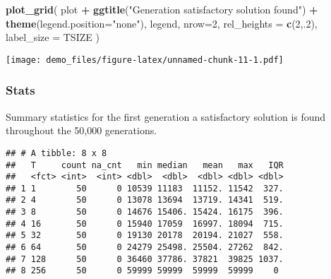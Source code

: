 \documentclass[]{book}
\newenvironment{Shaded}{\begin{snugshade}}{\end{snugshade}}
\newcommand{\DataTypeTok}[1]{\textcolor[rgb]{0.13,0.29,0.53}{#1}}
\newcommand{\DecValTok}[1]{\textcolor[rgb]{0.00,0.00,0.81}{#1}}
\newcommand{\KeywordTok}[1]{\textcolor[rgb]{0.13,0.29,0.53}{\textbf{#1}}}
\newcommand{\NormalTok}[1]{#1}
\newcommand{\OperatorTok}[1]{\textcolor[rgb]{0.81,0.36,0.00}{\textbf{#1}}}
\newcommand{\OtherTok}[1]{\textcolor[rgb]{0.56,0.35,0.01}{#1}}
\newcommand{\StringTok}[1]{\textcolor[rgb]{0.31,0.60,0.02}{#1}}
\begin{document}
\begin{Shaded}
\begin{Highlighting}[]
\KeywordTok{plot_grid}\NormalTok{(}
\NormalTok{  plot }\OperatorTok{+}
\StringTok{    }\KeywordTok{ggtitle}\NormalTok{(}\StringTok{"Generation satisfactory solution found"}\NormalTok{) }\OperatorTok{+}
\StringTok{    }\KeywordTok{theme}\NormalTok{(}\DataTypeTok{legend.position=}\StringTok{"none"}\NormalTok{),}
\NormalTok{  legend,}
  \DataTypeTok{nrow=}\DecValTok{2}\NormalTok{,}
  \DataTypeTok{rel_heights =} \KeywordTok{c}\NormalTok{(}\DecValTok{2}\NormalTok{,.}\DecValTok{2}\NormalTok{),}
  \DataTypeTok{label_size =}\NormalTok{ TSIZE}
\NormalTok{)}
\end{Highlighting}
\end{Shaded}

\texttt{[image: demo\_files/figure-latex/unnamed-chunk-11-1.pdf]}

\hypertarget{stats-18}{%
\subsubsection{Stats}\label{stats-18}}

Summary statistics for the first generation a satisfactory solution is found throughout the 50,000 generations.

\begin{Shaded}
\end{Shaded}

\begin{verbatim}
## # A tibble: 8 x 8
##   T     count na_cnt   min median   mean   max   IQR
##   <fct> <int>  <int> <dbl>  <dbl>  <dbl> <dbl> <dbl>
## 1 1        50      0 10539 11183  11152. 11542  327.
## 2 4        50      0 13078 13694  13719. 14341  519.
## 3 8        50      0 14676 15406. 15424. 16175  396.
## 4 16       50      0 15940 17059  16997. 18094  715.
## 5 32       50      0 19130 20178  20194. 21027  558.
## 6 64       50      0 24279 25498. 25504. 27262  842.
## 7 128      50      0 36460 37786. 37821  39825 1037.
## 8 256      50      0 59999 59999  59999  59999    0
\end{verbatim}
\end{document}

